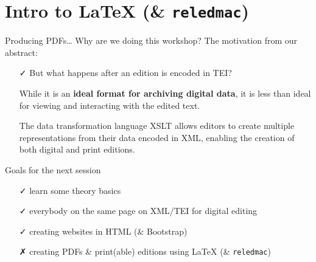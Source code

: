 

\section{Intro to \LaTeX{} (\& \texttt{reledmac})}

\begin{frame}{Producing PDFs\dots}
    Why are we doing this workshop? The motivation from our abstract:
    \begin{itemize}
        \item[\textcolor{w3schools}{\faCheck}] But what happens after an edition is encoded in TEI? 
        \item[\textcolor{w3schools}{\faHandORight}] While it is an \textbf{ideal format for archiving digital data}, it is \alert{less than ideal for viewing and interacting with the edited text.}
        \item[\textcolor{w3schools}{\faHandORight}] The data transformation language XSLT allows editors to create multiple representations from their data encoded in XML, enabling the creation of both digital and print editions. 
    \end{itemize}
    
    \begin{block}{Goals for the next session}
    \begin{enumerate}
        \item[\textcolor{w3schools}{\faCheck}] learn some theory basics
        \item[\textcolor{w3schools}{\faCheck}] everybody on the same page on XML/TEI for digital editing
        \item[\textcolor{w3schools}{\faCheck}] creating websites in HTML (\& Bootstrap)
        \item[\textcolor{alert}{\faClose}] creating PDFs \& print(able) editions using \LaTeX{} (\& \texttt{reledmac})
    \end{enumerate}
    \end{block}
\end{frame}


